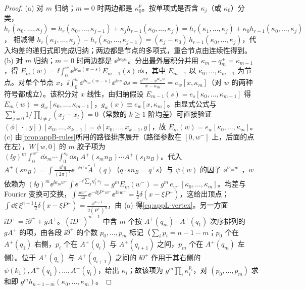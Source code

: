 \begin{proof}
(a) 对 $m$ 归纳；$m=0$ 时两边都是 $\kappa_0^p$。按单项式是否含 $\kappa_j$（或 $\kappa_0$）分类，
$h_r(\kappa_0,\dots,\kappa_j)=h_r(\kappa_0,\dots,\kappa_{j-1})+\kappa_jh_{r-1}(\kappa_0,\dots,\kappa_j)=h_r(\kappa_1,\dots,\kappa_j)+\kappa_0h_{r-1}(\kappa_0,\dots,\kappa_j)$，
相减得 $h_r(\kappa_1,\dots,\kappa_j)-h_r(\kappa_0,\dots,\kappa_{j-1})=(\kappa_j-\kappa_0)\,h_{r-1}(\kappa_0,\dots,\kappa_j)$，代入均差的递归式即完成归纳；两边都是节点的多项式，重合节点由连续性得到。
(b) 对 $m$ 归纳；$m=0$ 时两边都是 $\ee^{\ii\kappa_0w}$。分出最外层积分并用 $\kappa_m-q_m^+=\kappa_{m-1}$，得 $E_m(w)=\ii\int_0^w\ee^{\ii\kappa_m(w-s)}E_{m-1}(s)\,\dd s$，其中 $E_{m-1}$ 以 $\kappa_0,\dots,\kappa_{m-1}$ 为节点。对单个节点 $x$，$\ii\int_0^w\ee^{\ii\kappa_m(w-s)}\ee^{\ii xs}\,\dd s=\frac{\ee^{\ii xw}-\ee^{\ii\kappa_mw}}{x-\kappa_m}=e_w[x,\kappa_m]$（对 $w$ 的两种符号都成立）。该积分对 $x$ 线性，由归纳假设 $E_{m-1}(s)=e_s[\kappa_0,\dots,\kappa_{m-1}]$ 得 $E_m(w)=g_w[\kappa_0,\dots,\kappa_{m-1}]$，$g_w(x)\equiv e_w[x,\kappa_m]$。由显式公式与 $\sum_{j=0}^{k}1/\prod_{l\ne j}(x_j-x_l)=0$（常数的 $k\ge1$ 阶均差）可直接验证 $(\phi[\,\cdot\,,y])[x_0,\dots,x_{k-1}]=\phi[x_0,\dots,x_{k-1},y]$，故 $E_m(w)=e_w[\kappa_0,\dots,\kappa_m]$。
(c) 由\cref{prop:appB-rules}所用的路径排序展开（路径参数在 $[0,w^-]$ 上，后面的点在左），$W[w,0]$ 的 $m$ 胶子项为 $(\ii g)^m\int_0^{w^-}\!\dd s_m\cdots\int_0^{s_2}\!\dd s_1\,A^+(s_mn_B)\cdots A^+(s_1n_B)$。代入 $A^+(sn_B)=\int\frac{\dd^4q}{(2\pi)^4}\ee^{-\ii q^+s}\tilde A^+(q)$（$q\cdot sn_B=q^+s$）与 $\bar\psi(w)$ 的因子 $\ee^{\ii\kappa_mw^-}$，$w^-$ 依赖为 $(\ii g)^m\ee^{\ii\kappa_mw^-}\int\ee^{-\ii\sum_jq_j^+s_j}=g^mE_m(w^-)=g^m\,e_{w^-}[\kappa_0,\dots,\kappa_m]$。均差与 Fourier 变换可交换，$\int\frac{\dd w^-}{4\pi}\ee^{-\ii\xi P^+w^-}\ee^{\ii xw^-}=\frac12\delta(x-\xi P^+)$，这给出顶点；$\int\dd\xi\,\xi^{n-1}\frac12\delta(x-\xi P^+)=\frac{x^{n-1}}{2(P^+)^n}$，由 (a) 得\cref{eq:appL-vertex}。另一方面 $\ii D^+=\ii\partial^++gA^+$。$(\ii D^+)^{n-1}$ 中含 $m$ 个按 $A^+(q_m)\cdots A^+(q_1)$ 次序排列的 $gA^+$ 的项，由各段 $\ii\partial^+$ 的个数 $p_0,\dots,p_m$ 标记（$\sum_ip_i=n-1-m$；$p_0$ 个在 $A^+(q_1)$ 右侧，$p_i$ 个在 $A^+(q_i)$ 与 $A^+(q_{i+1})$ 之间，$p_m$ 个在 $A^+(q_m)$ 左侧）。位于 $A^+(q_i)$ 与 $A^+(q_{i+1})$ 之间的 $\ii\partial^+$ 作用于其右侧的 $\psi(k_1),A^+(q_1),\dots,A^+(q_i)$，给出 $\kappa_i$；故该项为 $g^m\prod_i\kappa_i^{p_i}$，对 $(p_0,\dots,p_m)$ 求和即 $g^mh_{n-1-m}(\kappa_0,\dots,\kappa_m)$。
\end{proof}

